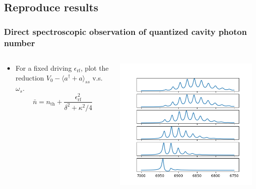 \documentclass[xcolor=dvipsnames,hyperref={CJKbookmarks=true}]{beamer}
\newcommand{\rf}{\text{rf}}
\newcommand{\thm}{\text{th}}
\begin{document}
\subsection{Reproduce results}
\begin{frame}[t]\frametitle{Direct spectroscopic observation of quantized cavity photon number}
\begin{columns}
\begin{column}{0.4\linewidth}
\begin{itemize}
	\item For a fixed driving $\epsilon_{\rf}$, plot the reduction
	$V_0 - \langle a^\dag + a\rangle_{ss}$ v.s. $\omega_{s}$. 
	\begin{equation*}
		\bar n = n_{\thm} + \frac{\epsilon_{\rf}^2}{\delta^2 + \kappa^2/4}
	\end{equation*}
\end{itemize}
\end{column}%
\begin{column}{0.6\linewidth}
	\centering
    \includegraphics[width=\textwidth]{sweaping.png}
\end{column}
\end{columns}
\end{frame}
\end{document}
